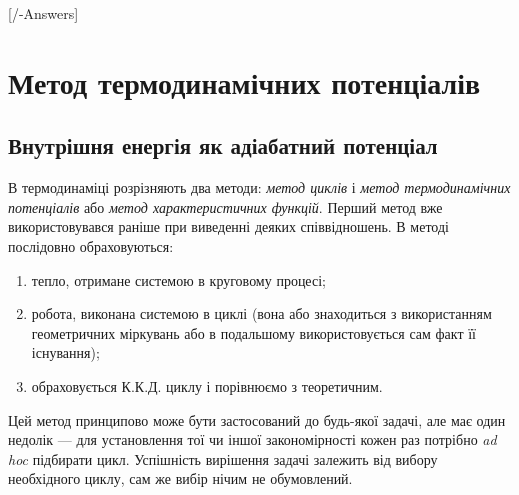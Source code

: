 
\setcounter{chapter}{4}
[\currfilebase/\currfilebase-Answers]
\chapter{Метод термодинамічних потенціалів}\label{\currfilebase}
\graphicspath{{\currfilebase/pictures}}
\makeatletter
{}
\makeatother

\section{Внутрішня енергія як адіабатний потенціал}

В термодинаміці розрізняють два методи: \emph{метод циклів} і \emph{метод термодинамічних потенціалів}
або \emph{метод характеристичних функцій}. Перший метод вже використовувався раніше при виведенні
деяких співвідношень. В методі послідовно обраховуються:
\begin{enumerate}
	\item [а)] тепло, отримане системою в круговому процесі;
	\item [б)] робота, виконана системою в циклі (вона або знаходиться з використанням геометричних міркувань або в подальшому використовується сам факт її існування);
	\item [в)] обраховується К.К.Д. циклу і порівнюємо з теоретичним.
\end{enumerate}

Цей метод принципово може бути застосований до будь-якої задачі, але має один недолік --- для установлення тої чи іншої закономірності кожен раз потрібно \emph{ad hoc} підбирати цикл. Успішність вирішення задачі залежить від вибору необхідного циклу, сам же вибір нічим не обумовлений.

